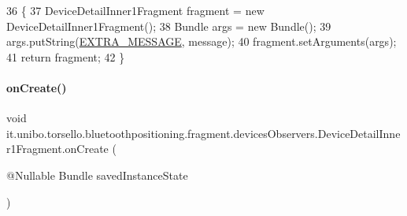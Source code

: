 \begin{DoxyCode}
36                                                                          \{
37         DeviceDetailInner1Fragment fragment = \textcolor{keyword}{new} DeviceDetailInner1Fragment();
38         Bundle args = \textcolor{keyword}{new} Bundle();
39         args.putString(\hyperlink{classit_1_1unibo_1_1torsello_1_1bluetoothpositioning_1_1fragment_1_1devicesObservers_1_1DeviceDetailInner1Fragment_a741715e0af61fb59e24b10e035411cbd_a741715e0af61fb59e24b10e035411cbd}{EXTRA\_MESSAGE}, message);
40         fragment.setArguments(args);
41         \textcolor{keywordflow}{return} fragment;
42     \}
\end{DoxyCode}
\hypertarget{classit_1_1unibo_1_1torsello_1_1bluetoothpositioning_1_1fragment_1_1devicesObservers_1_1DeviceDetailInner1Fragment_aa2c5b397a4773bcd426c4ce3f5e291b4_aa2c5b397a4773bcd426c4ce3f5e291b4}{}\label{classit_1_1unibo_1_1torsello_1_1bluetoothpositioning_1_1fragment_1_1devicesObservers_1_1DeviceDetailInner1Fragment_aa2c5b397a4773bcd426c4ce3f5e291b4_aa2c5b397a4773bcd426c4ce3f5e291b4} 
\paragraph{\texorpdfstring{on\+Create()}{onCreate()}}
{\footnotesize\ttfamily void it.\+unibo.\+torsello.\+bluetoothpositioning.\+fragment.\+devices\+Observers.\+Device\+Detail\+Inner1\+Fragment.\+on\+Create (\begin{DoxyParamCaption}\item[{@Nullable Bundle}]{saved\+Instance\+State }\end{DoxyParamCaption})}


